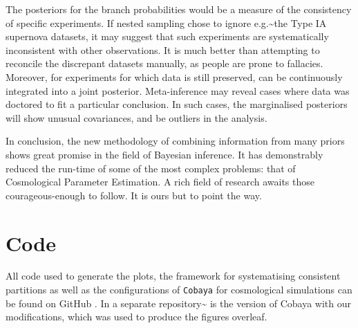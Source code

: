 \documentclass[draft,usenatbib]{mnras}
\begin{document}
The posteriors for the branch probabilities would be a measure of the
consistency of specific experiments. If nested sampling chose to
ignore e.g.\textasciitilde{}the Type IA supernova datasets, it may suggest that such
experiments are systematically inconsistent with other
observations. It is much better than attempting to reconcile the
discrepant datasets manually, as people are prone to
fallacies. Moreover, for experiments for which data is still
preserved, can be continuously integrated into a joint
posterior. Meta-inference may reveal cases where data was doctored to
fit a particular conclusion. In such cases, the marginalised
posteriors will show unusual covariances, and be outliers in the
analysis.


In conclusion, the new methodology of combining information from many
priors shows great promise in the field of Bayesian inference. It has
demonstrably reduced the run-time of some of the most complex
problems: that of Cosmological Parameter Estimation. A rich field of
research awaits those courageous-enough to follow. It is ours but to point
the way.

\section{Code}
\label{sec:org3775397}
All code used to generate the plots, the framework for systematising
consistent partitions as well as the configurations of \texttt{Cobaya}
for cosmological simulations can be found on GitHub \citep{sspr}. In a
separate repository\textasciitilde{}\citep{code} is the version of Cobaya with our
modifications, which was used to produce the figures overleaf.
\end{document}
